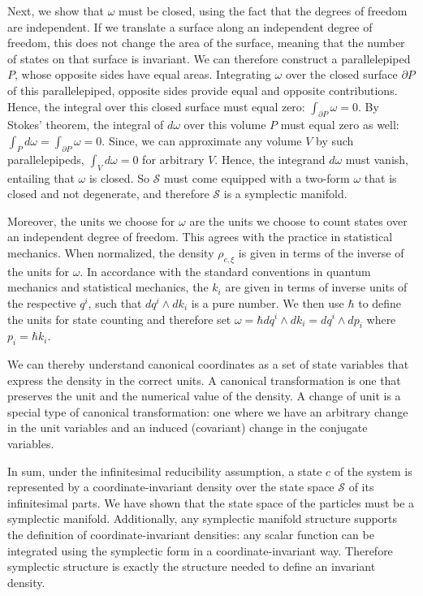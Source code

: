 \documentclass[12pt, twoside]{article}
\begin{document}
Next, we show that $\omega$ must be closed, using the fact that the degrees of freedom are independent. If we translate a surface along an independent degree of freedom, this does not change the area of the surface, meaning that the number of states on that surface is invariant. We can therefore construct a parallelepiped $P$, whose opposite sides have equal areas. Integrating $\omega$ over the closed surface $\partial P$ of this parallelepiped, opposite sides provide equal and opposite contributions. Hence, the integral over this closed surface must equal zero: $\int_{\partial P} \omega =0$. By Stokes' theorem, the integral of $d \omega$ over this volume $P$ must equal zero as well: $\int_P d \omega = \int_{\partial P} \omega =0$. Since, we can approximate any volume $V$ by such parallelepipeds, $\int_V d \omega = 0$ for arbitrary $V$. Hence, the integrand $d \omega$ must vanish, entailing that $\omega$ is closed. So $\mathcal{S}$ must come equipped with a two-form $\omega$ that is closed and not degenerate, and therefore $\mathcal{S}$ is a symplectic manifold.

Moreover, the units we choose for $\omega$ are the units we choose to count states over an independent degree of freedom. This agrees with the practice in statistical mechanics. When normalized, the density $\rho_{c, \xi}$ is given in terms of the inverse of the units for $\omega$. In accordance with the standard conventions in quantum mechanics and statistical mechanics, the $k_i$ are given in terms of inverse units of the respective $q^i$, such that $dq^i \wedge dk_i$ is a pure number. We then use $\hbar$ to define the units for state counting and therefore set $\omega = \hbar dq^i \wedge dk_i = dq^i \wedge dp_i$ where $p_i = \hbar k_i$.

We can thereby understand canonical coordinates as a set of state variables that express the density in the correct units. A canonical transformation is one that preserves the unit and the numerical value of the density. A change of unit is a special type of canonical transformation: one where we have an arbitrary change in the unit variables and an induced (covariant) change in the conjugate variables.
 
 
In sum, under the infinitesimal reducibility assumption, a state $c$ of the system is represented by a coordinate-invariant density over the state space $\mathcal{S}$ of its infinitesimal parts. We have shown that the state space of the particles must be a symplectic manifold. Additionally, any symplectic manifold structure supports the definition of coordinate-invariant densities: any scalar function can be integrated using the symplectic form in a coordinate-invariant way. Therefore symplectic structure is exactly the structure needed to define an invariant density. 
\end{document}
